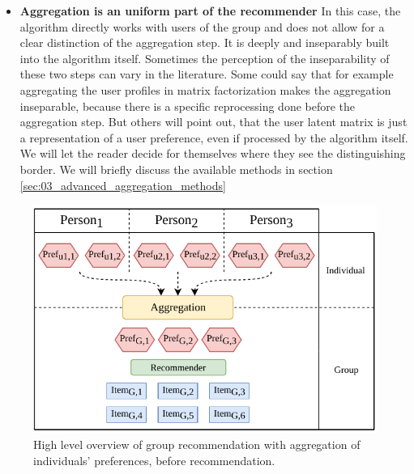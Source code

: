 \begin{itemize}
    \item \textbf{Aggregation is an uniform part of the recommender} \newline
    In this case, the algorithm directly works with users of the group and does not allow for a clear distinction of the aggregation step. It is deeply and inseparably built into the algorithm itself. Sometimes the perception of the inseparability of these two steps can vary in the literature. Some could say that for example aggregating the user profiles in matrix factorization makes the aggregation inseparable, because there is a specific reprocessing done before the aggregation step. But others will point out, that the user latent matrix is just a representation of a user preference, even if processed by the algorithm itself. We will let the reader decide for themselves where they see the distinguishing border. We will briefly discuss the available methods in section \ref{sec:03_advanced_aggregation_methods}
\end{itemize}

\begin{figure}[htbp]
    \centering
    \includegraphics{img/before-rec-aggregation.pdf}
    \caption{High level overview of group recommendation with aggregation of individuals' preferences, before recommendation.}
    \label{fig:before_rec_agg}
\end{figure}

